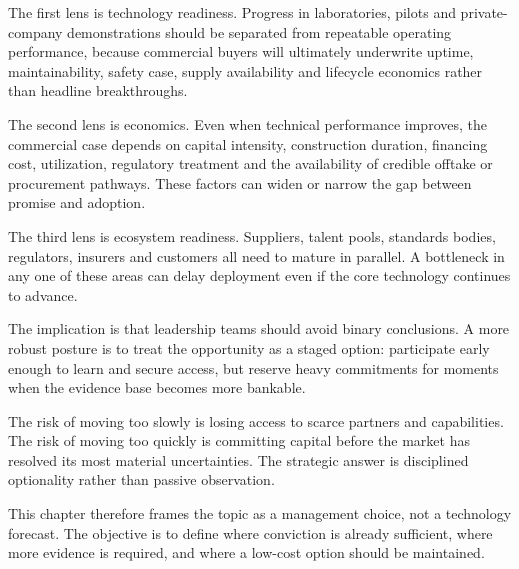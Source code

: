 \documentclass[10pt,a4paper]{article}
\begin{document}
{\small The first lens is technology readiness. Progress in laboratories, pilots and private-company demonstrations should be separated from repeatable operating performance, because commercial buyers will ultimately underwrite uptime, maintainability, safety case, supply availability and lifecycle economics rather than headline breakthroughs.}\par
{\small The second lens is economics. Even when technical performance improves, the commercial case depends on capital intensity, construction duration, financing cost, utilization, regulatory treatment and the availability of credible offtake or procurement pathways. These factors can widen or narrow the gap between promise and adoption.}\par
{\small The third lens is ecosystem readiness. Suppliers, talent pools, standards bodies, regulators, insurers and customers all need to mature in parallel. A bottleneck in any one of these areas can delay deployment even if the core technology continues to advance.}\par
{\small The implication is that leadership teams should avoid binary conclusions. A more robust posture is to treat the opportunity as a staged option: participate early enough to learn and secure access, but reserve heavy commitments for moments when the evidence base becomes more bankable.}\par
{\small The risk of moving too slowly is losing access to scarce partners and capabilities. The risk of moving too quickly is committing capital before the market has resolved its most material uncertainties. The strategic answer is disciplined optionality rather than passive observation.}\par
{\small This chapter therefore frames the topic as a management choice, not a technology forecast. The objective is to define where conviction is already sufficient, where more evidence is required, and where a low-cost option should be maintained.}\par
\label{chap:3:end}
\end{document}
